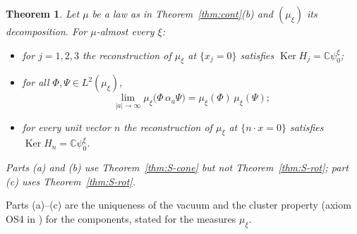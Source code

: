 \documentclass[11pt]{amsart}
\theoremstyle{plain}
\newtheorem{theorem}{Theorem}[section]
\theoremstyle{definition}
\theoremstyle{remark}
\numberwithin{equation}{section}
\newcommand{\C}{\mathbb{C}}
\newcommand{\abs}[1]{\lvert #1\rvert}
\newcommand{\Ker}{\operatorname{Ker}}
\begin{document}
\begin{theorem}\label{thm:OS4}
Let $\mu$ be a law as in Theorem~\ref{thm:cont}(b) and $(\mu_\xi)$ its decomposition. For $\mu$-almost every $\xi$:
\begin{itemize}
\item[(a)] for $j=1,2,3$ the reconstruction of $\mu_\xi$ at $\{x_j=0\}$ satisfies $\Ker H_j=\C{\psi_0^\xi}$;
\item[(b)] for all $\Phi,\Psi\in L^2(\mu_\xi)$,
\[
\lim_{\abs a\to\infty}\mu_\xi\big(\Phi\,\alpha_a\Psi\big)=\mu_\xi(\Phi)\,\mu_\xi(\Psi);
\]
\item[(c)] for every unit vector $n$ the reconstruction of $\mu_\xi$ at $\{n\cdot x=0\}$ satisfies $\Ker H_n=\C{\psi_0^\xi}$.
\end{itemize}
Parts (a) and (b) use Theorem~\ref{thm:S-cone} but not Theorem~\ref{thm:S-rot}; part (c) uses Theorem~\ref{thm:S-rot}.
\end{theorem}

Parts (a)--(c) are the uniqueness of the vacuum and the cluster property \cite[(E4)]{OS73} (axiom OS4 in \cite[Sect.~6.1]{GJ}) for the components, stated for the measures $\mu_\xi$.
\end{document}
